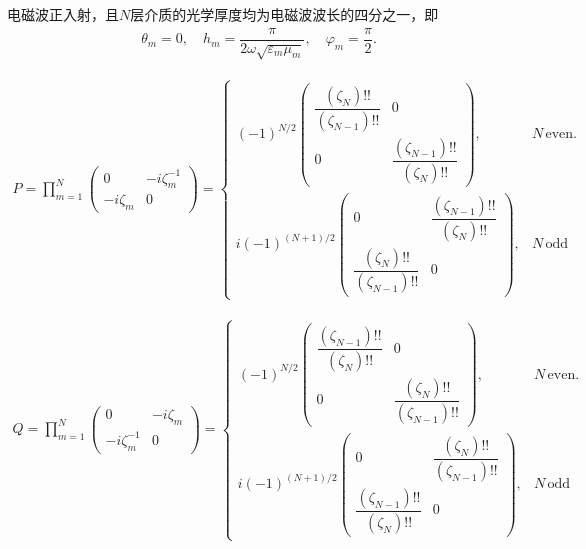 \begin{exbox}
	电磁波正入射，且\(N\)层介质的光学厚度均为电磁波波长的四分之一，即
	\begin{align*}
		\theta_m = 0,\quad h_m = \dfrac{\pi}{2\omega\sqrt{\varepsilon_m\mu_m}}, \quad \varphi_m = \dfrac{\pi}{2}.
	\end{align*}

	\begin{align*}
		P = \prod_{m=1}^{N}
		\begin{pmatrix}
			0         & -i\zeta_m^{-1} \\
			-i\zeta_m & 0
		\end{pmatrix}
		=
		\begin{cases}
			(-1)^{N/2}
			\begin{pmatrix}
				\dfrac{(\zeta_{N})!!}{(\zeta_{N-1})!!} & 0                                      \\[8pt]
				0                                      & \dfrac{(\zeta_{N-1})!!}{(\zeta_{N})!!}
			\end{pmatrix}, & N\,\text{even}. \\[20pt]
			i(-1)^{(N+1)/2}
			\begin{pmatrix}
				0                                      & \dfrac{(\zeta_{N-1})!!}{(\zeta_{N})!!} \\[8pt]
				\dfrac{(\zeta_{N})!!}{(\zeta_{N-1})!!} & 0
			\end{pmatrix}, & N\,\text{odd}
		\end{cases}
	\end{align*}

	\begin{align*}
		Q = \prod_{m=1}^{N}
		\begin{pmatrix}
			0              & -i\zeta_m \\
			-i\zeta_m^{-1} & 0
		\end{pmatrix}
		=
		\begin{cases}
			(-1)^{N/2}
			\begin{pmatrix}
				\dfrac{(\zeta_{N-1})!!}{(\zeta_{N})!!} & 0                                      \\[8pt]
				0                                      & \dfrac{(\zeta_{N})!!}{(\zeta_{N-1})!!}
			\end{pmatrix}, & N\,\text{even}. \\[20pt]
			i(-1)^{(N+1)/2}
			\begin{pmatrix}
				0                                      & \dfrac{(\zeta_{N})!!}{(\zeta_{N-1})!!} \\[8pt]
				\dfrac{(\zeta_{N-1})!!}{(\zeta_{N})!!} & 0
			\end{pmatrix}, & N\,\text{odd}
		\end{cases}
	\end{align*}


\end{exbox}
